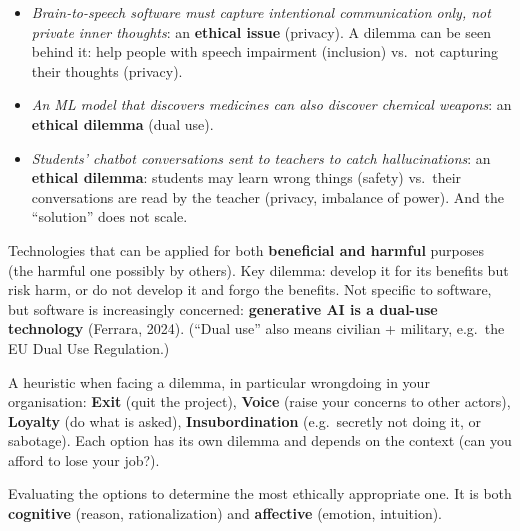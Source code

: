 \documentclass[11pt,a4paper,openany]{book}
\begin{document}
\begin{exbox}[title={Review questions of the session}]
\begin{itemize}
  \item \emph{Brain-to-speech software must capture intentional communication only, not
        private inner thoughts}: an \textbf{ethical issue} (privacy). A dilemma can be seen
        behind it: help people with speech impairment (inclusion) vs.\ not capturing their
        thoughts (privacy).
  \item \emph{An ML model that discovers medicines can also discover chemical weapons}: an
        \textbf{ethical dilemma} (dual use).
  \item \emph{Students' chatbot conversations sent to teachers to catch hallucinations}: an
        \textbf{ethical dilemma}: students may learn wrong things (safety) vs.\ their
        conversations are read by the teacher (privacy, imbalance of power). And the
        ``solution'' does not scale.
\end{itemize}
\end{exbox}

\begin{defnbox}[title={Dual use (Imperiale \& Casadevall, 2015; Forge, 2010)}]
Technologies that can be applied for both \textbf{beneficial and harmful} purposes (the harmful
one possibly by others). Key dilemma: develop it for its benefits but risk harm, or do not
develop it and forgo the benefits. Not specific to software, but software is increasingly
concerned: \textbf{generative AI is a dual-use technology} (Ferrara, 2024). (``Dual use'' also
means civilian + military, e.g.\ the EU Dual Use Regulation.)
\end{defnbox}

\begin{propbox}[title={Exit, Voice, Loyalty + Insubordination: ``EVIL'' (Lennerfors, 2021; Hirschman, 1972)}]
A heuristic when facing a dilemma, in particular wrongdoing in your organisation:
\textbf{Exit} (quit the project), \textbf{Voice} (raise your concerns to other actors),
\textbf{Loyalty} (do what is asked), \textbf{Insubordination} (e.g.\ secretly not doing it, or
sabotage). Each option has its own dilemma and depends on the context (can you afford to lose
your job?).
\end{propbox}

\begin{defnbox}[title={Judgment (the Evaluate step)}]
Evaluating the options to determine the most ethically appropriate one. It is both
\textbf{cognitive} (reason, rationalization) and \textbf{affective} (emotion, intuition).
\end{defnbox}
\end{document}
